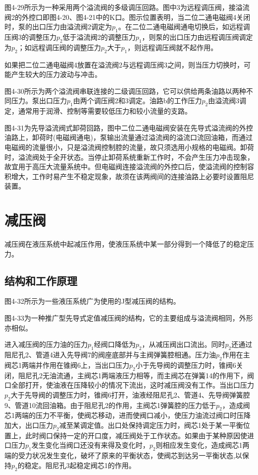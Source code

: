 
\mainmatter
图4-29所示为一种采用两个溢流阀的多级调压回路。图中3为远程调压阀，接溢流阀2的外控口即图4-20、图4-21中的K口。图示位置表明，当二位二通电磁阀4关闭时，泵的出口压力由溢流阀2调定为$p_{1}$。在二位二通电磁阀通电切换后，如远程调压阀3的调整压力$p_{2}$低于溢流阀2的调整压力$p_{1}$，则泵的出口压力由远程调压阀调定为$p_{2}$；如远程调压阀的调整压力$p_{2}$大于$p_{1}$，则远程调压阀就不起作用。

如果把二位二通电磁阀4放置在溢流阀2与远程调压阀3之间，则当压力切换时，可能产生较大的压力波动与冲击。

图4-30所示为两个溢流阀串联连接的二级调压回路，它可以供给两条油路以两种不同压力。泵出口压力$p_{1}$由两个调压阀2和3调定。油路b的工作压力$p_{2}$由溢流阀3调定，通常用于润滑、控制等需要较低压力和较小流量的支路。

图4-31为先导溢流阀式卸荷回路，图中二位二通电磁阀安装在先导式溢流阀的外控油路上，卸荷时(电磁阀通电)，泵输出流量通过溢流阀的溢流口流回油箱，而通过电磁阀的流量很小，只是溢流阀控制腔的流量，故只须选用小规格的电磁阀。卸荷时，溢流阀处于全开状态。当停止卸荷系统重新工作时，不会产生压力冲击现象，故宜用于高压大流量系统中。但电磁阀连接溢流阀的外控口后，使溢流阀的控制容积增大，工作时易产生不稳定现象，故须在该两阀间的连接油路上必要时设置阻尼装置。

\section{减压阀}

减压阀在液压系统中起减压作用，使液压系统中某一部分得到一个降低了的稳定压力。

\subsection{结构和工作原理}

图4-32所示为一些液压系统广为使用的J型减压阀的结构。

图4-33为一种推广型先导式定值减压阀的结构，它的主要组成与溢流阀相同，外形亦相似。

进入减压阀的压力油的压力$p_{1}$经阀口降低为$p_{2}$，从减压阀出口流出。同时$p_{2}$还通过阻尼孔2、管道4进入先导阀7的阀座底部并与主阀弹簧腔相通。压力油$p_{2}$作用在主阀芯1两端并作用在锥阀6上，当出口压力$p_{2}$小于先导阀的调整压力时，锥阀6关闭，阻尼孔2无油流通，主阀芯1两端液压力相等，而主阀芯在弹簧14的作用下，阀口全部打开，使油液在压降较小的情况下流出，这时减压阀没有工作。当出口压力$p_{2}$大于先导阀的调整压力时，锥阀6打开，油液经阻尼孔2、管道4、先导阀弹簧腔9、管道10流回油箱。由于阻尼孔2的作用，主阀芯1弹簧腔的压力低于$p_{2}$，造成阀芯1两端的压力不平衡，使阀芯移动，进而使阀口减小，使压力油流过阀口时压降加大，出口压力$p_{2}$减至某调定值。出口处保持调定压力时，阀芯1处于某一平衡位置上，此时阀口保持一定的开口度，减压阀处于工作状态。如果由于某种原因使进口压力$p_{1}$发生变化当阀口还没有来得及变化时，$p_{2}$则相应发生变化，造成阀芯1两端的受力状况发生变化，破坏了原来的平衡状态，使阀芯到达另一平衡状态,以保持$p_{2}$的稳定。阻尼孔3起稳定阀芯1的作用。

